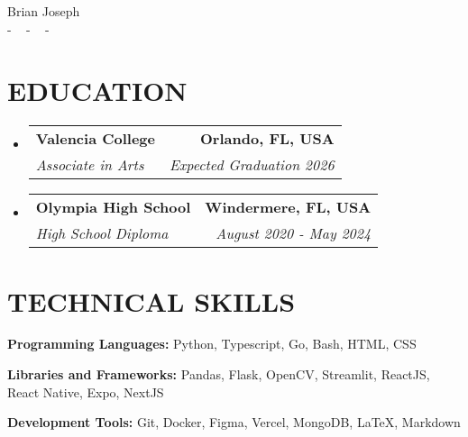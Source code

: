\documentclass[letterpaper,11pt]{article}
\makeatletter
\newcommand{\resumeSubheading}[4]{
  \vspace{-2pt}\item
    \begin{tabular*}{1.0\textwidth}[t]{l@{\extracolsep{\fill}}r}
      \textbf{\large#1} & \textbf{\small #2} \\
      \textit{\large#3} & \textit{\small #4} \\
      
    \end{tabular*}\vspace{-7pt}
}
\newcommand{\resumeSubHeadingListStart}{\begin{itemize}[leftmargin=0.0in, label={}]}
\newcommand{\resumeSubHeadingListEnd}{\end{itemize}}
\makeatother
\begin{document}


\begin{center}
    {\huge Brian Joseph} \\ \vspace{2pt} 
    \small{-}
    \href{mailto:brianjoseph1758@gmail.com}{\color{blue}{brian@brianjoseph.me}} ~ 
    \small{-}
    \href{https://linkedin.com/in/brianjoseph1758}{ \color{blue}{linkedin.com/in/brianjoseph1758}}  ~
    \small{-}
    \href{https://github.com/lonesume}{ \color{blue}{github.com/lonesume}} ~
    \vspace{-7pt}
\end{center}

\section{\color{airforceblue}EDUCATION}
  \resumeSubHeadingListStart
    \resumeSubheading
      {Valencia College}{Orlando, FL, USA}
      {Associate in Arts}{Expected Graduation 2026}
    \vspace{-4pt}
     \resumeSubheading
      {Olympia High School}{Windermere, FL, USA}
      {High School Diploma}{August 2020 - May 2024}
  \resumeSubHeadingListEnd
  \vspace{-10pt}

\section{\color{airforceblue}TECHNICAL SKILLS}
 \begin{itemize}[leftmargin=0in, label={}]
    \small{\item{
     \textbf{\normalsize{Programming Languages:}}{ \normalsize{Python, Typescript, Go, Bash, HTML, CSS}} \\
      \vspace{1.2pt}
      
     \textbf{\normalsize{Libraries and Frameworks:}}{ \normalsize{Pandas, Flask, OpenCV, Streamlit, ReactJS, React Native, Expo, NextJS }} \\
      \vspace{1.2pt}
      
     \textbf{\normalsize{Development Tools:}}{ \normalsize{Git, Docker, Figma, Vercel, MongoDB, LaTeX, Markdown }}

     }}
 \end{itemize}
 \vspace{-16pt}
\end{document}

